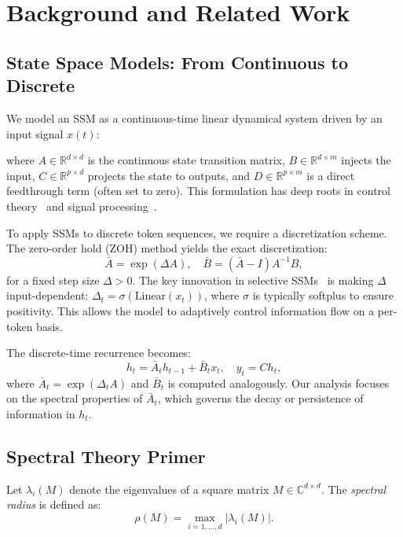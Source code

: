 \documentclass[10pt,twocolumn]{article}
\begin{document}
\section{Background and Related Work}
\label{sec:background}

\subsection{State Space Models: From Continuous to Discrete}

We model an SSM as a continuous-time linear dynamical system driven by an input signal $x(t)$:

where $A\in\mathbb{R}^{d\times d}$ is the continuous state transition matrix, $B\in\mathbb{R}^{d\times m}$ injects the input, $C\in\mathbb{R}^{p\times d}$ projects the state to outputs, and $D\in\mathbb{R}^{p\times m}$ is a direct feedthrough term (often set to zero). This formulation has deep roots in control theory~\cite{kalman1960contributions} and signal processing~\cite{oppenheim1999discrete}.

To apply SSMs to discrete token sequences, we require a discretization scheme. The zero-order hold (ZOH) method yields the exact discretization:
\begin{equation}
    \bar{A} = \exp(\Delta A), \quad \bar{B} = (\bar{A} - I) A^{-1} B,
    \label{eq:discretization_exact}
\end{equation}
for a fixed step size $\Delta>0$. The key innovation in selective SSMs~\cite{gu2023mamba} is making $\Delta$ input-dependent: $\Delta_t = \sigma(\text{Linear}(x_t))$, where $\sigma$ is typically softplus to ensure positivity. This allows the model to adaptively control information flow on a per-token basis.

The discrete-time recurrence becomes:
\begin{equation}
    h_t = \bar{A}_t h_{t-1} + \bar{B}_t x_t, \quad y_t = C h_t,
    \label{eq:dts_update}
\end{equation}
where $\bar{A}_t = \exp(\Delta_t A)$ and $\bar{B}_t$ is computed analogously. Our analysis focuses on the spectral properties of $\bar{A}_t$, which governs the decay or persistence of information in $h_t$.

\subsection{Spectral Theory Primer}

Let $\lambda_i(M)$ denote the eigenvalues of a square matrix $M\in\mathbb{C}^{d\times d}$. The \emph{spectral radius} is defined as:
\begin{equation}
    \rho(M) = \max_{i=1,\dots,d} |\lambda_i(M)|.
    \label{eq:spectral_radius_def}
\end{equation}
\end{document}
